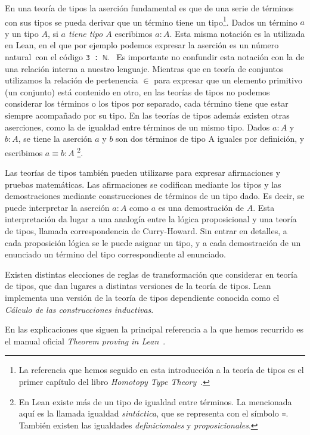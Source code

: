 En una teoría de tipos la aserción fundamental es \guillemotleft que de una serie de
términos con sus tipos se pueda derivar que un término tiene un
tipo\guillemotright\footnote{La referencia que hemos seguido en esta introducción a la teoría
	de tipos es el primer capítulo del libro \textit{Homotopy Type
		Theory}~\cite{HomotopyTypeTheory}.}. Dados un término $a$ y un tipo $A$, si
\textit{$a$ tiene tipo $A$} escribimos $a:A$. Esta misma notación es la
utilizada en Lean, en el que por ejemplo podemos expresar la aserción
 es un número natural\guillemotright\ con el código \lstinline{3 : ℕ}.
\
Es importante no confundir esta notación con la de una relación interna a
nuestro lenguaje. Mientras que en teoría de conjuntos utilizamos la relación de
pertenencia $\in$ para expresar que un elemento primitivo (un conjunto) está
contenido en otro, en las teorías de tipos no podemos considerar los términos o
los tipos por separado, cada término tiene que estar siempre acompañado por su
tipo. En las teorías de tipos además existen otras aserciones, como la de
igualdad entre términos de un mismo tipo. Dados $a:A$ y $b:A$, se tiene la
aserción \guillemotleft $a$ y $b$ son dos términos de tipo A iguales por
definición\guillemotright, y escribimos $a\equiv b : A$ \footnote{En
	Lean existe más de un tipo de igualdad entre términos. La mencionada
	aquí es la llamada igualdad \textit{sintáctica}, que se representa con el
	símbolo \lstinline{=}. También existen las igualdades \textit{definicionales} y
\textit{proposicionales}.}.

Las teorías de tipos también pueden utilizarse para expresar afirmaciones y
pruebas matemáticas. Las afirmaciones se codifican mediante los tipos y
las demostraciones mediante construcciones de términos de un tipo dado. Es
decir, se puede interpretar la aserción $a : A$ como \guillemotleft$a$ es una
demostración de $A$\guillemotright. Esta interpretación da lugar a una analogía
entre la lógica proposicional y una teoría de tipos, llamada correspondencia de
Curry-Howard. Sin entrar en detalles, a cada proposición lógica se le puede
asignar un tipo, y a cada demostración de un enunciado un término del tipo
correspondiente al enunciado.

Existen distintas elecciones de reglas de transformación que considerar en
teoría de tipos, que dan lugares a distintas versiones de la teoría de tipos.
Lean implementa una versión de la teoría de tipos dependiente conocida como
el \textit{Cálculo de las construcciones inductivas}.

En las explicaciones que siguen la principal referencia a la que hemos recurrido
es el manual oficial \textit{Theorem proving in Lean}~\cite{avigadLeanTheoremProver}.

